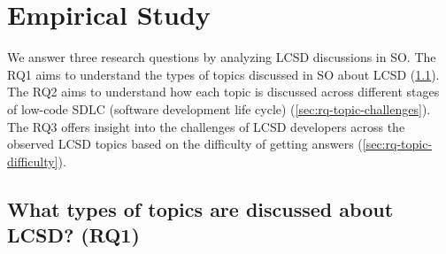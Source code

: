 \section{Empirical Study} \label{sec:results}
We answer three research questions by analyzing LCSD discussions in SO.
The RQ1 aims to understand the types of topics discussed in
SO about LCSD (\sec\ref{sec:rq-topic-type}). The RQ2 aims to understand how each topic is discussed across different stages of low-code SDLC (software development life cycle) (\sec\ref{sec:rq-topic-challenges}). The RQ3 offers insight into the challenges of LCSD 
developers across the observed LCSD topics based on the difficulty of getting answers (\sec\ref{sec:rq-topic-difficulty}).


\subsection{What types of topics are discussed about LCSD? (RQ1)}\label{sec:rq-topic-type}

 


